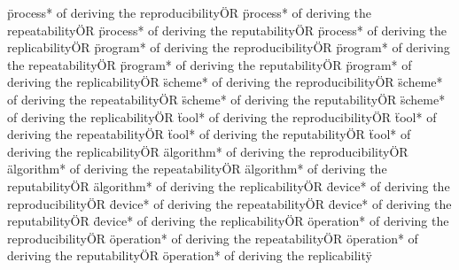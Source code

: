 \documentclass[
10pt, %
a4paper, %
oneside, %
headinclude,footinclude, %
BCOR5mm, %
]{scrartcl}
\begin{document}
\"process* of deriving the reproducibility\" OR \"process* of deriving the repeatability\" OR \"process* of deriving the reputability\" OR \"process* of deriving the replicability\" OR 
\"program* of deriving the reproducibility\" OR \"program* of deriving the repeatability\" OR \"program* of deriving the reputability\" OR \"program* of deriving the replicability\" OR 
\"scheme* of deriving the reproducibility\" OR \"scheme* of deriving the repeatability\" OR \"scheme* of deriving the reputability\" OR \"scheme* of deriving the replicability\" OR 
\"tool* of deriving the reproducibility\" OR \"tool* of deriving the repeatability\" OR \"tool* of deriving the reputability\" OR \"tool* of deriving the replicability\" OR 
\"algorithm* of deriving the reproducibility\" OR \"algorithm* of deriving the repeatability\" OR \"algorithm* of deriving the reputability\" OR \"algorithm* of deriving the replicability\" OR 
\"device* of deriving the reproducibility\" OR \"device* of deriving the repeatability\" OR \"device* of deriving the reputability\" OR \"device* of deriving the replicability\" OR 
\"operation* of deriving the reproducibility\" OR \"operation* of deriving the repeatability\" OR \"operation* of deriving the reputability\" OR \"operation* of deriving the replicability\" 
\end{document}
